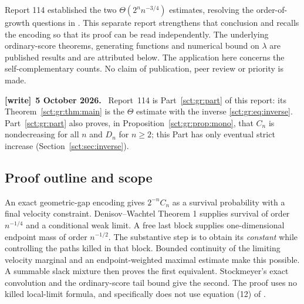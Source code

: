 \documentclass[11pt,letterpaper]{article}
\theoremstyle{definition}\newtheorem{remark}[theorem]{Remark}
\newenvironment{writenote}[1][]{\par\smallskip\begingroup\small
 \noindent\textbf{[write]}\if\relax\detokenize{#1}\relax\else~\textbf{#1.}\fi\ }%
 {\par\endgroup\smallskip}
\begin{document}
Report 114 established the two $\Theta(2^n n^{-3/4})$ estimates, resolving the
order-of-growth questions in \cite[Section 6]{stockmeyer}. This separate report
strengthens that conclusion and recalls the encoding so that its proof can be
read independently. The underlying ordinary-score theorems, generating
functions and numerical bound on $\lambda$ are published results and are
attributed below. The application here concerns the self-complementary
counts. No claim of publication, peer review or priority is made.
\begin{writenote}[5 October 2026]
Report~114 is Part~\ref{sct:gr:part} of this report: its Theorem~\ref{sct:gr:thm:main} is the $\Theta$ estimate with the inverse \eqref{sct:gr:eq:inverse}. Part~\ref{sct:gr:part} also proves, in Proposition~\ref{sct:gr:prop:mono}, that $C_n$ is nondecreasing for all $n$ and $D_n$ for $n\ge2$; this Part has only eventual strict increase (Section~\ref{sct:sec:inverse}).
\end{writenote}

\subsection{Proof outline and scope}
An exact geometric-gap encoding gives $2^{-n}C_n$ as a survival probability
with a final velocity constraint. Denisov--Wachtel Theorem 1 supplies survival
of order $n^{-1/4}$ and a conditional weak limit. A free last block supplies
one-dimensional endpoint mass of order $n^{-1/2}$. The substantive step is
to obtain its \emph{constant} while controlling the paths killed in that block.
Bounded continuity of the limiting velocity marginal and an endpoint-weighted
maximal estimate make this possible. A summable slack mixture then proves
the first equivalent. Stockmeyer's exact convolution and the ordinary-score
tail bound give the second. The proof uses no killed local-limit formula,
and specifically does not use equation (12) of \cite{dw}.
\end{document}
